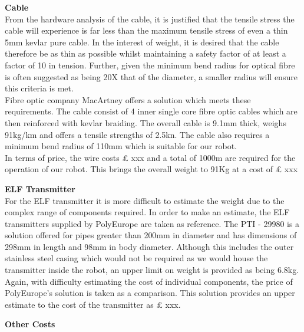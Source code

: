 \documentclass[11pt]{article}		%
\begin{document}
			\textbf{Cable}\\
			From the hardware analysis of the cable, it is justified that the tensile stress the cable will experience is far less than the maximum tensile stress of even a thin 5mm kevlar pure cable. In the interest of weight, it is desired that the cable therefore be as thin as possible whilst maintaining a safety factor of at least a factor of 10 in tension. Further, given the minimum bend radius for optical fibre is often suggested as being 20X that of the diameter, a smaller radius will ensure this criteria is met.\\
	    	\hspace*{3ex}Fibre optic company MacArtney offers a solution which meets these requirements. The cable consist of 4 inner single core fibre optic cables which are then reinforced with kevlar braiding. The overall cable is 9.1mm thick, weighs 91kg/km and offers a tensile strengths of 2.5kn. The cable also requires a minimum bend radius of 110mm which is suitable for our robot. \\
	    	\hspace*{3ex}In terms of price, the wire costs £ xxx and a total of 1000m are required for the operation of our robot. This brings the overall weight to 91Kg at a cost of £ xxx 
	
	        \textbf{ELF Transmitter}\\
	        For the ELF transmitter it is more difficult to estimate the weight due to the complex range of components required. In order to make an estimate, the ELF transmitters supplied by PolyEurope are taken as reference. The PTI - 29980 is a solution offered for pipes greater than 200mm in diameter and has dimensions of 298mm in length and 98mm in body diameter. Although this includes the outer stainless steel casing which would not be required as we would house the transmitter inside the robot, an upper limit on weight is provided as being 6.8kg.\\
	        \hspace*{3ex}Again, with difficulty estimating the cost of individual components, the price of PolyEurope’s solution is taken as a comparison. This solution provides an upper estimate to the cost of the transmitter as £ xxx. 
	    
	        \textbf{Other Costs}\\
	
\end{document}
